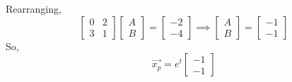 Rearranging,
\begin{equation*}
	\begin{bmatrix}
		0 & 2 \\
		3 & 1
	\end{bmatrix}\begin{bmatrix}
		A \\
		B
	\end{bmatrix} = \begin{bmatrix}
		-2 \\
		-4
	\end{bmatrix} \implies \begin{bmatrix}
		A \\
		B
	\end{bmatrix} = \begin{bmatrix}
		-1 \\
		-1
	\end{bmatrix}
\end{equation*}
So,
\begin{equation*}
	\vec{x_p} = e^t\begin{bmatrix}
		-1 \\
		-1
	\end{bmatrix}
\end{equation*}

